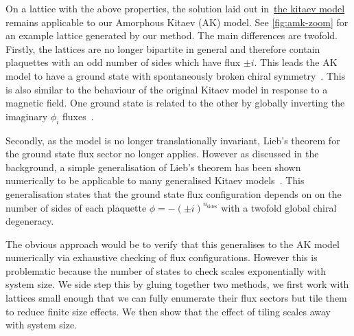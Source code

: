 On a lattice with the above properties, the solution laid out in~\protect\hyperlink{bg-hkm-model}{the kitaev model} remains applicable to our Amorphous Kitaev (AK) model. See \cref{fig:amk-zoom} for an example lattice generated by our method. The main differences are twofold. Firstly, the lattices are no longer bipartite in general and therefore contain plaquettes with an odd number of sides which have flux \(\pm i\). This leads the AK model to have a ground state with spontaneously broken chiral symmetry~\autocite{Chua2011,yaoExactChiralSpin2007,ChuaPRB2011,Fiete2012,Natori2016,Wu2009,Peri2020,WangHaoranPRB2021}. This is also similar to the behaviour of the original Kitaev model in response to a magnetic field. One ground state is related to the other by globally inverting the imaginary \(\phi_i\) fluxes~\autocite{yaoExactChiralSpin2007}.

Secondly, as the model is no longer translationally invariant, Lieb's theorem for the ground state flux sector no longer applies. However as discussed in the background, a simple generalisation of Lieb's theorem has been shown numerically to be applicable to many generalised Kitaev models~\autocite{eschmannThermodynamicClassificationThreedimensional2020,Yao2009,eschmann2019thermodynamics,Peri2020}. This generalisation states that the ground state flux configuration depends on on the number of sides of each plaquette \(\phi = -(\pm i)^{n_{\mathrm{sides}}}\) with a twofold global chiral degeneracy.

The obvious approach would be to verify that this generalises to the AK model numerically via exhaustive checking of flux configurations. However this is problematic because the number of states to check scales exponentially with system size. We side step this by gluing together two methods, we first work with lattices small enough that we can fully enumerate their flux sectors but tile them to reduce finite size effects. We then show that the effect of tiling scales away with system size.

